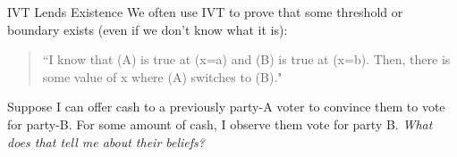 \documentclass[10pt]{beamer}
\begin{document}
\begin{frame}{IVT Lends Existence}
    We often use IVT to prove that some threshold or boundary exists (even if we don't know what it is): \\
    \vspace{.75cm}
    \begin{quote}
        ``I know that (A) is true at (x=a) and (B) is true at (x=b). Then, there is some value of x where (A) switches to (B)."
    \end{quote}
    Suppose I can offer cash to a previously party-A voter to convince them to vote for party-B. For some amount of cash, I observe them vote for party B. \emph{What does that tell me about their beliefs?}
\end{frame}
\end{document}
